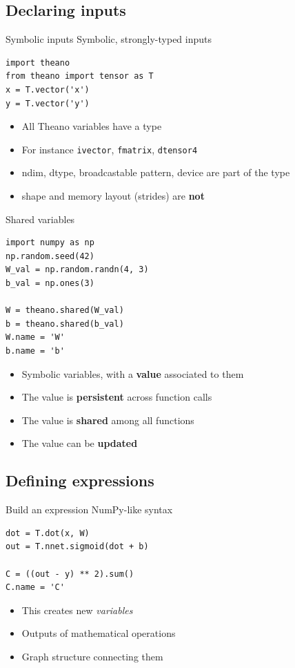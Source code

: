 \documentclass[a4paper,9pt]{beamer}
\begin{document}
\subsection{Declaring inputs}
\begin{frame}[fragile]{Symbolic inputs}
  Symbolic, strongly-typed inputs
  \begin{verbatim}
import theano
from theano import tensor as T
x = T.vector('x')
y = T.vector('y')
  \end{verbatim}

  \begin{itemize}
    \item All Theano variables have a type
    \item For instance \verb|ivector|, \verb|fmatrix|, \verb|dtensor4|
    \item ndim, dtype, broadcastable pattern, device are part of the type
    \item shape and memory layout (strides) are {\bf not}
  \end{itemize}
\end{frame}


\begin{frame}[fragile]{Shared variables}
  \begin{verbatim}
import numpy as np
np.random.seed(42)
W_val = np.random.randn(4, 3)
b_val = np.ones(3)

W = theano.shared(W_val)
b = theano.shared(b_val)
W.name = 'W'
b.name = 'b'
  \end{verbatim}
  \begin{itemize}
    \item Symbolic variables, with a \textbf{value} associated to them
    \item The value is \textbf{persistent} across function calls
    \item The value is \textbf{shared} among all functions
    \item The value can be \textbf{updated}
  \end{itemize}
\end{frame}

\subsection{Defining expressions}
\begin{frame}[fragile]{Build an expression}
  NumPy-like syntax
  \begin{verbatim}
dot = T.dot(x, W)
out = T.nnet.sigmoid(dot + b)

C = ((out - y) ** 2).sum()
C.name = 'C'
  \end{verbatim}

  \begin{itemize}
    \item This creates new \emph{variables}
    \item Outputs of mathematical operations
    \item Graph structure connecting them
  \end{itemize}
\end{frame}
\end{document}
